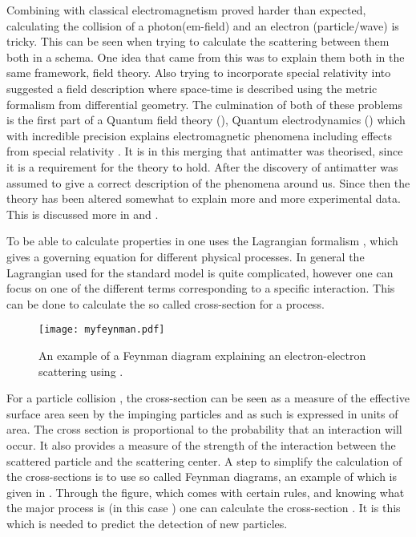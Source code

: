 Combining \abbrQM with classical electromagnetism proved harder than expected, calculating the collision of a photon(em-field) and an electron (particle/wave) is tricky. This can be seen when trying to calculate the scattering between them both in a \abbrQM schema. One idea that came from this was to explain them both in the same framework, field theory. Also trying to incorporate special relativity into \abbrQM suggested a field description where space-time is described using the metric formalism from differential geometry.
The culmination of both of these problems is the first part of a Quantum field theory (\abbrQFT), Quantum electrodynamics (\abbrQED) which with incredible precision explains electromagnetic phenomena including effects from special relativity \citep{Zee:2003}. It is in this merging that antimatter was theorised, since it is a requirement for the theory to hold. After the discovery of antimatter \abbrQED was assumed to give a correct description of the phenomena around us. Since then the theory has been altered somewhat to explain more and more experimental data. This is discussed more in  and .

To be able to calculate properties in \abbrQFT one uses the Lagrangian formalism \citep{Goldstein:2001}, which gives a governing equation for different physical processes. In general the Lagrangian used for the standard model is quite complicated, however one can focus on one of the different terms corresponding to a specific interaction. This can be done to calculate the so called cross-section for a process. 

\begin{SCfigure}[][h]
 \centering
 \texttt{[image: myfeynman.pdf]}
  \caption{{\small An example of a Feynman diagram explaining an electron-electron scattering using \abbrQED.}}
    \label{fig:exFeynman}
\end{SCfigure}

For a particle collision \citep{Herr:2006}, the cross-section can be seen as a measure of the effective surface area seen by the impinging particles and as such is expressed in units of area. The cross section is proportional to the probability that an interaction will occur. It also provides a measure of the strength of the interaction between the scattered particle and the scattering center. A step to simplify the calculation of the cross-sections is to use so called Feynman diagrams, an example of which is given in . Through the figure, which comes with certain rules, and knowing what the major process is (in this case \abbrQED) one can calculate the cross-section \citep{Zee:2003,Herr:2006}. It is this which is needed to predict the detection of new particles. 


